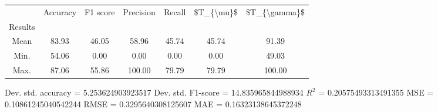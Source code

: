 \begin{tabular}{|c|c|c|c|c|c|c|}
\toprule
{} &  Accuracy &  F1 score &  Precision &  Recall &  \$T\_\{\textbackslash mu\}\$ &  \$T\_\{\textbackslash gamma\}\$ \\
Results &           &           &            &         &            &               \\
\hline
Mean    &     83.93 &     46.05 &      58.96 &   45.74 &      45.74 &         91.39 \\
Min.    &     54.06 &      0.00 &       0.00 &    0.00 &       0.00 &         49.03 \\
Max.    &     87.06 &     55.86 &     100.00 &   79.79 &      79.79 &        100.00 \\
\bottomrule
\end{tabular}

 Dev. std. accuracy = 5.253624903923517
 Dev. std. F1-score = 14.835965844988934
 $R^2$ = 0.20575493313491355
 MSE = 0.10861245040542244
 RMSE = 0.3295640308125607
 MAE = 0.16323138645372248